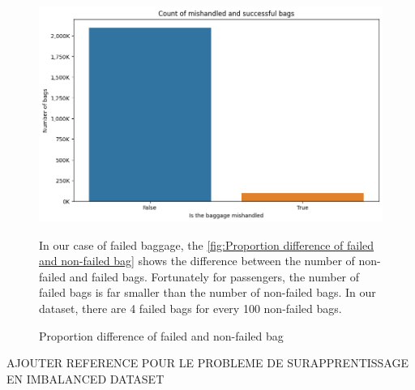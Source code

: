 \documentclass[12pt]{article}
\begin{document}
\begin{figure}[htbp]
    \centering
    \begin{minipage}{0.55\textwidth}
        \centering
        \includegraphics[width=\textwidth]{is_failed unbalanced.png} %
        \caption{Proportion difference of failed and non-failed bag}
        \label{fig:Proportion difference of failed and non-failed bag}
    \end{minipage}
    \hfill
    \begin{minipage}{0.3\textwidth}
        In our case of failed baggage, the \autoref{fig:Proportion difference of failed and non-failed bag} shows the difference between the number of non-failed and failed bags. Fortunately for passengers, the number of failed bags is far smaller than the number of non-failed bags. In our dataset, there are 4 failed bags for every 100 non-failed bags.
    \end{minipage}
\end{figure}

AJOUTER REFERENCE POUR LE PROBLEME DE SURAPPRENTISSAGE EN IMBALANCED DATASET
\end{document}
